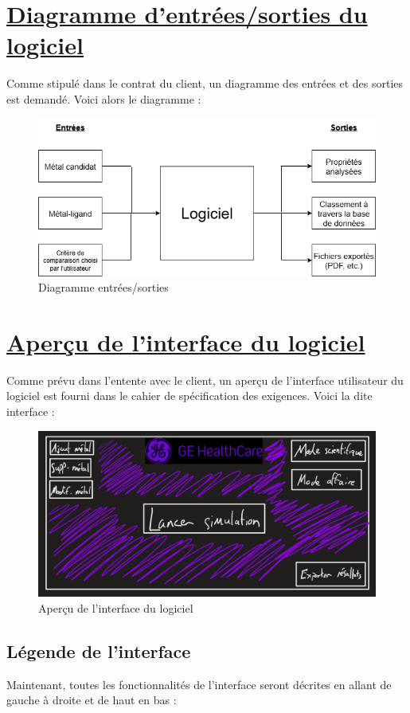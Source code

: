 \documentclass[11pt]{article}
\begin{document}
\section{\underline{Diagramme d'entrées/sorties du logiciel}}
Comme stipulé dans le contrat du client, un diagramme des entrées et des sorties est demandé. Voici alors le diagramme :

\begin{figure}[h!]
  \includegraphics[width=\linewidth]{diagramme.png}
  \caption{Diagramme entrées/sorties}
\end{figure}
\pagebreak


\section{\underline{Aperçu de l'interface du logiciel}}
Comme prévu dans l'entente avec le client, un aperçu de l'interface utilisateur du logiciel est fourni dans le cahier de spécification des exigences. Voici la dite interface :

\begin{figure}[h!]
  \includegraphics[width=\linewidth]{interface.png}
  \caption{Aperçu de l'interface du logiciel}
\end{figure}

\subsection{Légende de l'interface}
Maintenant, toutes les fonctionnalités de l'interface seront décrites en allant de gauche à droite et de haut en bas :
\end{document}
